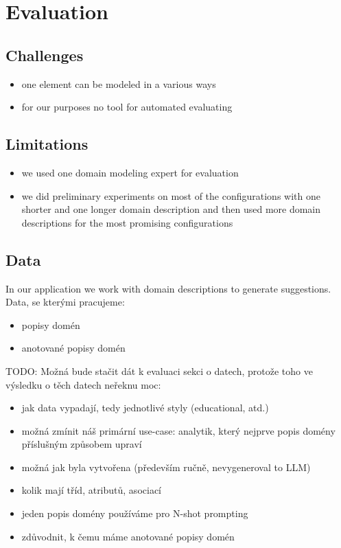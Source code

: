 \chapter{Evaluation}

\section{Challenges}
\begin{itemize}
\item one element can be modeled in a various ways
\item for our purposes no tool for automated evaluating
\end{itemize}


\section{Limitations}
\begin{itemize}
\item we used one domain modeling expert for evaluation
\item we did preliminary experiments on most of the configurations with one shorter and one longer domain description and then used more domain descriptions for the most promising configurations
\end{itemize}


\section{Data}

In our application we work with domain descriptions to generate suggestions. \\

Data, se kterými pracujeme:
\begin{itemize}
\item popisy domén
\item anotované popisy domén
\end{itemize}


TODO: Možná bude stačit dát k evaluaci sekci o datech, protože toho ve výsledku o těch datech neřeknu moc:
\begin{itemize}
\item jak data vypadají, tedy jednotlivé styly (educational, atd.)
\item možná zmínit náš primární use-case: analytik, který nejprve popis domény příslušným způsobem upraví
\item možná jak byla vytvořena (především ručně, nevygeneroval to LLM)
\item kolik mají tříd, atributů, asociací
\item jeden popis domény používáme pro N-shot prompting
\item zdůvodnit, k čemu máme anotované popisy domén
\end{itemize}


